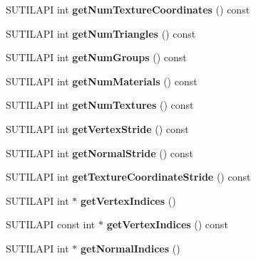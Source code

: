 \begin{DoxyCompactItemize}
S\+U\+T\+I\+L\+A\+PI int {\bfseries get\+Num\+Texture\+Coordinates} () const
\item 
\mbox{\label{class_mesh_storage_a77554ba82dbadb8447bf5b720300fd6b}} 
S\+U\+T\+I\+L\+A\+PI int {\bfseries get\+Num\+Triangles} () const
\item 
\mbox{\label{class_mesh_storage_abbd69f6731422beb9729c4050fe6162d}} 
S\+U\+T\+I\+L\+A\+PI int {\bfseries get\+Num\+Groups} () const
\item 
\mbox{\label{class_mesh_storage_ab9197e26cf1711403237811ff0f81338}} 
S\+U\+T\+I\+L\+A\+PI int {\bfseries get\+Num\+Materials} () const
\item 
\mbox{\label{class_mesh_storage_ab7419e400e0e7d2d7637900d9b22113b}} 
S\+U\+T\+I\+L\+A\+PI int {\bfseries get\+Num\+Textures} () const
\item 
\mbox{\label{class_mesh_storage_a3e3d17b0f1a6484b5cbe02979fbc7ad9}} 
S\+U\+T\+I\+L\+A\+PI int {\bfseries get\+Vertex\+Stride} () const
\item 
\mbox{\label{class_mesh_storage_a55fe3f7c803af6cac3026422e5334616}} 
S\+U\+T\+I\+L\+A\+PI int {\bfseries get\+Normal\+Stride} () const
\item 
\mbox{\label{class_mesh_storage_a2412634420e6a9ba066acdc4a45585b6}} 
S\+U\+T\+I\+L\+A\+PI int {\bfseries get\+Texture\+Coordinate\+Stride} () const
\item 
\mbox{\label{class_mesh_storage_a4cea4eb20a81a39bd8ecc7c07fb08c64}} 
S\+U\+T\+I\+L\+A\+PI int $\ast$ {\bfseries get\+Vertex\+Indices} ()
\item 
\mbox{\label{class_mesh_storage_aa45260149381a38d28f54ff4b435b210}} 
S\+U\+T\+I\+L\+A\+PI const int $\ast$ {\bfseries get\+Vertex\+Indices} () const
\item 
\mbox{\label{class_mesh_storage_abd202c7c97a0726557eaec35b5751a36}} 
S\+U\+T\+I\+L\+A\+PI int $\ast$ {\bfseries get\+Normal\+Indices} ()
\item 

\end{DoxyCompactItemize}
